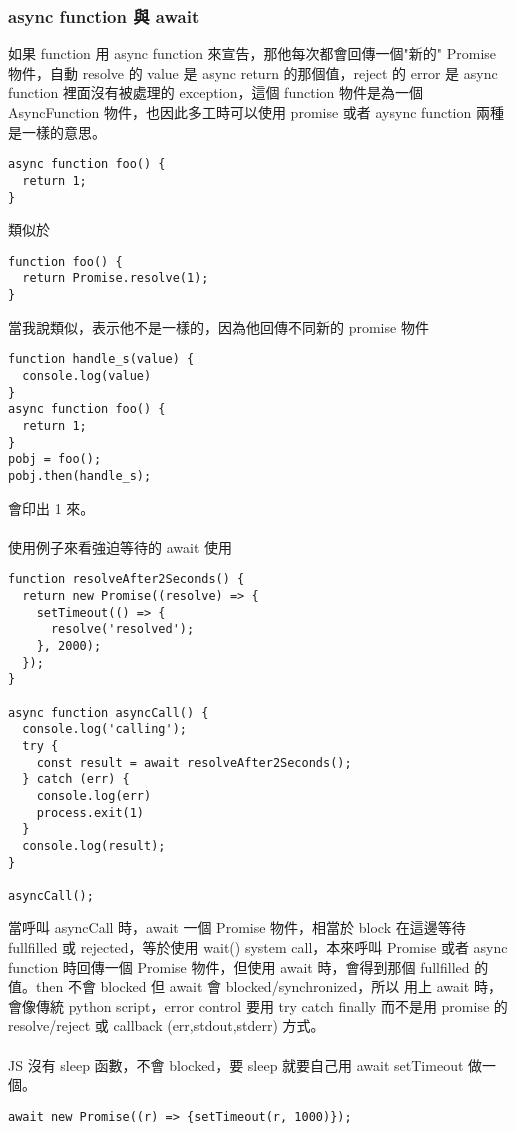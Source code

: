   \subsubsection{async function 與 await}
  如果 function 用 async function 來宣告，那他每次都會回傳一個"新的" Promise
  物件，自動 resolve 的 value 是 async return 的那個值，reject 的 error
  是 async function 裡面沒有被處理的 exception，這個 function 物件是為一個
  AsyncFunction 物件，也因此多工時可以使用 promise 或者 aysync function 兩種
  是一樣的意思。
  \begin{verbatim}
async function foo() {
  return 1;
}
  \end{verbatim}
  類似於
  \begin{verbatim}
function foo() {
  return Promise.resolve(1);
}
  \end{verbatim}
  當我說類似，表示他不是一樣的，因為他回傳不同新的 promise 物件
  \begin{verbatim}
function handle_s(value) {
  console.log(value)
}
async function foo() {
  return 1;
}
pobj = foo();
pobj.then(handle_s);
  \end{verbatim}
  會印出 1 來。
  \\\\
  使用例子來看強迫等待的 await 使用
  \begin{verbatim}
function resolveAfter2Seconds() {
  return new Promise((resolve) => {
    setTimeout(() => {
      resolve('resolved');
    }, 2000);
  });
}

async function asyncCall() {
  console.log('calling');
  try { 
    const result = await resolveAfter2Seconds();
  } catch (err) {
    console.log(err)
    process.exit(1)
  }
  console.log(result);
}

asyncCall();
  \end{verbatim}
  當呼叫 asyncCall 時，await 一個 Promise 物件，相當於 block 在這邊等待
  fullfilled 或 rejected，等於使用 wait() system call，本來呼叫 Promise 或者
  async function 時回傳一個 Promise 物件，但使用 await 時，會得到那個
  fullfilled 的值。then 不會 blocked 但 await 會 blocked/synchronized，所以
  用上 await 時，會像傳統 python script，error control 要用 try catch finally
  而不是用 promise 的 resolve/reject 或 callback (err,stdout,stderr) 方式。
  \\\\
  JS 沒有 sleep 函數，不會 blocked，要 sleep 就要自己用 await setTimeout
  做一個。
  \begin{verbatim}
await new Promise((r) => {setTimeout(r, 1000)});
  \end{verbatim}
